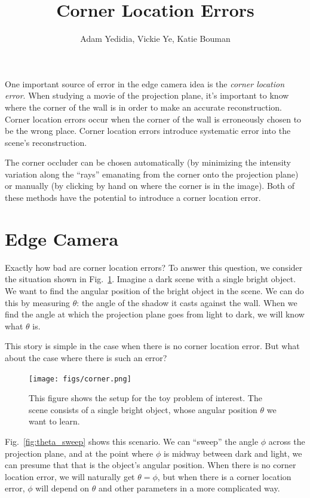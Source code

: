 \documentclass[11pt]{article}
\title{Corner Location Errors}
\author{Adam Yedidia, Vickie Ye, Katie Bouman}
\begin{document}
\maketitle

One important source of error in the edge camera idea is the \emph{corner location error}. When studying a movie of the projection plane, it's important to know where the corner of the wall is in order to make an accurate reconstruction. Corner location errors occur when the corner of the wall is erroneously chosen to be the wrong place. Corner location errors introduce systematic error into the scene's reconstruction.

The corner occluder can be chosen automatically (by minimizing the intensity variation along the ``rays'' emanating from the corner onto the projection plane) or manually (by clicking by hand on where the corner is in the image). Both of these methods have the potential to introduce a corner location error.

\section{Edge Camera}

Exactly how bad are corner location errors? To answer this question, we consider the situation shown in Fig.~\ref{fig:corner}. Imagine a dark scene with a single bright object. We want to find the angular position of the bright object in the scene. We can do this by measuring $\theta$: the angle of the shadow it casts against the wall. When we find the angle at which the projection plane goes from light to dark, we will know what $\theta$ is.

This story is simple in the case when there is no corner location error. But what about the case where there is such an error?

\begin{figure}
\centering
\texttt{[image: figs/corner.png]}
\caption{This figure shows the setup for the toy problem of interest. The scene consists of a single bright object, whose angular position $\theta$ we want to learn. \label{fig:corner}}
\end{figure}

Fig.~\ref{fig:theta_sweep} shows this scenario. We can ``sweep'' the angle $\phi$ across the projection plane, and at the point where $\phi$ is midway between dark and light, we can presume that that is the object's angular position. When there is no corner location error, we will naturally get $\theta = \phi$, but when there is a corner location error, $\phi$ will depend on $\theta$ and other parameters in a more complicated way.
\end{document}
